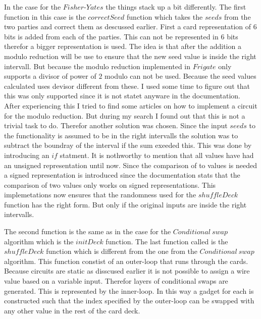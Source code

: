 \documentclass[twoside,11pt,openright]{report}
\begin{document}
In the case for the $Fisher\text{-}Yates$ the things stack up a bit differently. The first function in this case is the $correctSeed$ function which takes the $seeds$ from the two parties and correct them as descussed earlier. First a card representation of $6$ bits is added from each of the parties. This can not be represented in $6$ bits therefor a bigger representation is used. The idea is that after the addition a modulo reduction will be use to ensure that the new seed value is inside the right intervall. But because the modulo reduction implemented in $Frigate$ only supports a divisor of power of $2$ modulo can not be used. Because the seed values calculated uses devisor different from these. I used some time to figure out that this was only supported since it is not statet anyware in the documentation. After experiencing this I tried to find some articles on how to implement a circuit for the modulo reduction. But during my search I found out that this is not a trivial task to do. Therefor another solution was chosen. Since the input $seeds$ to the functionality is assumed to be in the right intervalls the solution was to subtract the boundray of the interval if the sum exeeded this. This was done by introducing an $if$ statment. It is nothworthy to mention that all values have had an unsigned representation until now. Since the comparison of to values is needed a signed representation is introduced since the documentation stats that the comparison of two values only works on signed representations. This implemetations now ensures that the randomness used for the $shuffleDeck$ function has the right form. But only if the original inputs are inside the right intervalls.

The second function is the same as in the case for the $Conditional~swap$ algorithm which is the $initDeck$ function. The last function called is the $shuffleDeck$ function which is different from the one from the $Conditional~swap$ algorithm. This function constist of an outer-loop that runs through the cards. Because circuits are static as disscused earlier it is not possible to assign a wire value based on a variable input. Therefor layers of conditional swaps are generated. This is represented by the inner-loop. In this way a gadget for each is constructed such that the index specified by the outer-loop can be swapped with any other value in the rest of the card deck.


\end{document}
